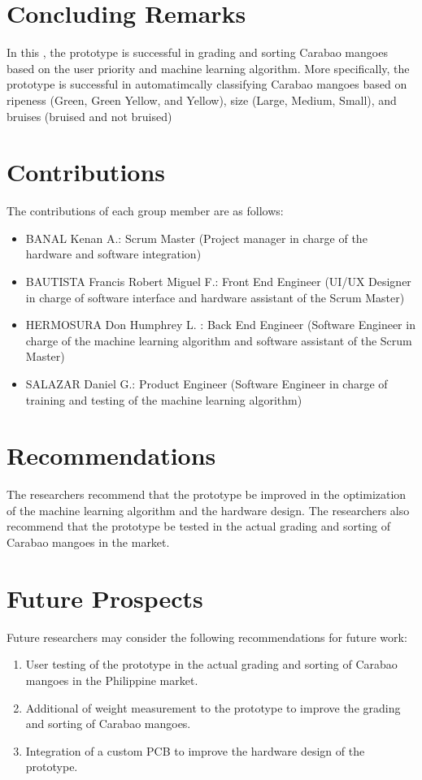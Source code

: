 \section{Concluding Remarks}

In this \documentType, the prototype is successful in grading and sorting Carabao mangoes based on 
the user priority and machine learning algorithm. More specifically, the prototype is successful in
automatimcally classifying Carabao mangoes based on ripeness (Green, Green Yellow, and Yellow), 
size (Large, Medium, Small), and bruises (bruised and not bruised)

\section{Contributions}

The contributions of each group member are as follows:
\begin{itemize}
  \item BANAL Kenan A.: Scrum Master (Project manager in charge of the hardware and software integration) 
  \item BAUTISTA Francis Robert Miguel F.: Front End Engineer (UI/UX Designer in charge of software interface 
  and hardware assistant of the Scrum Master) 
  \item HERMOSURA Don Humphrey L. : Back End Engineer (Software Engineer in charge of the 
  machine learning algorithm and software assistant of the Scrum Master)
  \item SALAZAR Daniel G.: Product Engineer (Software Engineer in charge of training and testing of 
  the machine learning algorithm)
\end{itemize}


\section{Recommendations}

The researchers recommend that the prototype be improved in the optimization of the machine learning algorithm
and the hardware design. The researchers also recommend that the prototype be tested in the 
actual grading and sorting of Carabao mangoes in the market. 

\section{Future Prospects}

Future researchers may consider the following recommendations for future work:
\begin{enumerate}
	\item  User testing of the prototype in the actual grading and sorting of Carabao mangoes in the Philippine market.
	\item  Additional of weight measurement to the prototype to improve the grading and sorting of Carabao mangoes.
	\item  Integration of a custom PCB to improve the hardware design of the prototype.
\end{enumerate}

